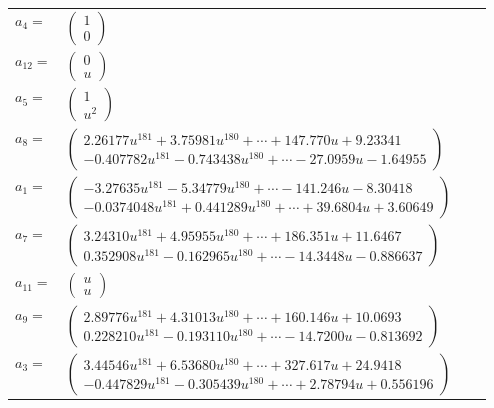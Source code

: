 \documentclass[1p]{elsarticle_modified}
\theoremstyle{definition}
\begin{document}
\begin{tabular}{m{7pt} m{180pt} m{7pt} m{180pt} }
\flushright $a_{4}=$&$\begin{pmatrix}1\\0\end{pmatrix}$ \\
\flushright $a_{12}=$&$\begin{pmatrix}0\\u\end{pmatrix}$ \\
\flushright $a_{5}=$&$\begin{pmatrix}1\\u^2\end{pmatrix}$ \\
\flushright $a_{8}=$&$\begin{pmatrix}2.26177 u^{181}+3.75981 u^{180}+\cdots+147.770 u+9.23341\\-0.407782 u^{181}-0.743438 u^{180}+\cdots-27.0959 u-1.64955\end{pmatrix}$ \\
\flushright $a_{1}=$&$\begin{pmatrix}-3.27635 u^{181}-5.34779 u^{180}+\cdots-141.246 u-8.30418\\-0.0374048 u^{181}+0.441289 u^{180}+\cdots+39.6804 u+3.60649\end{pmatrix}$ \\
\flushright $a_{7}=$&$\begin{pmatrix}3.24310 u^{181}+4.95955 u^{180}+\cdots+186.351 u+11.6467\\0.352908 u^{181}-0.162965 u^{180}+\cdots-14.3448 u-0.886637\end{pmatrix}$ \\
\flushright $a_{11}=$&$\begin{pmatrix}u\\u\end{pmatrix}$ \\
\flushright $a_{9}=$&$\begin{pmatrix}2.89776 u^{181}+4.31013 u^{180}+\cdots+160.146 u+10.0693\\0.228210 u^{181}-0.193110 u^{180}+\cdots-14.7200 u-0.813692\end{pmatrix}$ \\
\flushright $a_{3}=$&$\begin{pmatrix}3.44546 u^{181}+6.53680 u^{180}+\cdots+327.617 u+24.9418\\-0.447829 u^{181}-0.305439 u^{180}+\cdots+2.78794 u+0.556196\end{pmatrix}$ \\

\end{tabular}
\end{document}
